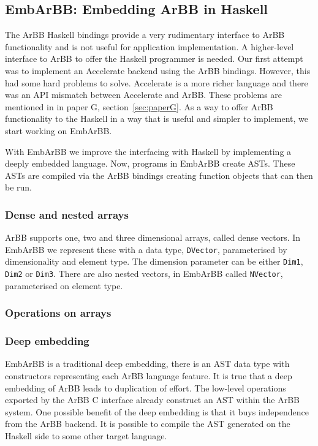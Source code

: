 \documentclass[a4paper]{book}
\begin{document}


\subsection{EmbArBB: Embedding ArBB in Haskell}
\label{sec:EmbArBB} 

The ArBB Haskell bindings provide a very rudimentary interface to ArBB functionality and 
is not useful for application implementation. A higher-level interface to ArBB to offer 
the Haskell programmer is needed. Our first attempt was to implement an Accelerate backend 
using the ArBB bindings. However, this had some hard problems to solve. Accelerate is a 
more richer language and there was an API mismatch between Accelerate and ArBB. These problems 
are mentioned in in paper G, section~\ref{sec:paperG}. As a way to offer ArBB functionality 
to the Haskell in a way that is useful and simpler to implement, we start working on EmbArBB. 

With EmbArBB we improve the interfacing with Haskell by implementing a deeply embedded language. 
Now, programs in EmbArBB create ASTs. These ASTs are compiled via the ArBB bindings creating 
function objects that can then be run. 

\subsubsection{Dense and nested arrays}

ArBB supports one, two and three dimensional arrays, called dense vectors. In EmbArBB we 
represent these with a data type, {\tt DVector}, parameterised by dimensionality and 
element type. The dimension parameter can be either {\tt Dim1}, {\tt Dim2} or {\tt Dim3}. 
There are also nested vectors, in EmbArBB called {\tt NVector}, parameterised on element type. 

\subsubsection{Operations on arrays} 



\subsubsection{Deep embedding}

EmbArBB is a traditional deep embedding, there is an AST data type with constructors 
representing each ArBB language feature. It is true that a deep embedding of ArBB 
leads to duplication of effort. The low-level operations exported by the 
ArBB C interface already construct an AST within the ArBB system. One possible benefit 
of the deep embedding is that it buys independence from the ArBB backend. It is possible 
to compile the AST generated on the Haskell side to some other target language. 
\end{document}
